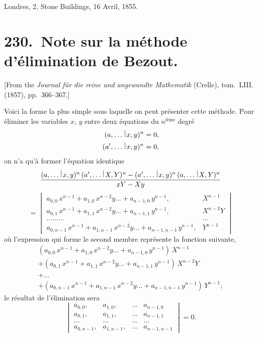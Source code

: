 \documentclass[11pt,a4paper]{book}
\theoremstyle{plain}
\newcommand{\wrule}{\hspace{-0.1em}\mid\hspace{-0.1em}}
\begin{document}
\begin{flushright}
Londres, 2, Stone Buildings, 16 Avril, 1855.
\end{flushright}
\newpage

\chapter[Note sur la m\'{e}thode d'\'{e}limination de Bezout]{230.\ Note sur la m\'{e}thode d'\'{e}limination de Bezout.}
\label{paper230}

\begin{center}
\small
[From the \textit{Journal f\"{u}r die reine und angewandte Mathematik} (Crelle), tom.~LIII. (1857), pp.~366--367.]
\end{center}

\bigskip

Voici la forme la plus simple sous laquelle on peut pr\'{e}senter cette m\'{e}thode. Pour \'{e}liminer les variables $x$, $y$ entre deux \'{e}quations du $n^{\text{i\`{e}me}}$ degr\'{e}
\begin{align*}
(a,\ldots\,\raisebox{0.5ex}{$\wrule$}\,x,y)^n&=0,\\
(a',\ldots\,\raisebox{0.5ex}{$\wrule$}\,x,y)^n&=0,
\end{align*}
on n'a qu'\`{a} former l'\'{e}quation identique
\[
\frac{(a,\ldots\,\raisebox{0.5ex}{$\wrule$}\,x,y)^n\,(a',\ldots\,\raisebox{0.5ex}{$\wrule$}\,X,Y)^n-(a',\ldots\,\raisebox{0.5ex}{$\wrule$}\,x,y)^n\,(a,\ldots\,\raisebox{0.5ex}{$\wrule$}\,X,Y)^n}{xY-Xy}
\]
\[
=\begin{vmatrix}
a_{0,0}\,x^{n-1}+a_{1,0}\,x^{n-2}y\ldots+a_{n-1,0}\,y^{n-1}, & X^{n-1}\\
a_{0,1}\,x^{n-1}+a_{1,1}\,x^{n-2}y\ldots+a_{n-1,1}\,y^{n-1}, & X^{n-2}Y\\
\ldots\ldots\ldots & \ldots\\
a_{0,n-1}\,x^{n-1}+a_{1,n-1}\,x^{n-2}y\ldots+a_{n-1,n-1}\,y^{n-1}, & Y^{n-1}
\end{vmatrix}
\]
o\`{u} l'expression qui forme le second membre repr\'{e}sente la fonction suivante,
\begin{multline*}
(a_{0,0}\,x^{n-1}+a_{1,0}\,x^{n-2}y\ldots+a_{n-1,0}\,y^{n-1})\,X^{n-1}\\
+(a_{0,1}\,x^{n-1}+a_{1,1}\,x^{n-2}y\ldots+a_{n-1,1}\,y^{n-1})\,X^{n-2}Y\\
+\ldots\\
+(a_{0,n-1}\,x^{n-1}+a_{1,n-1}\,x^{n-2}y\ldots+a_{n-1,n-1}\,y^{n-1})\,Y^{n-1};
\end{multline*}
le r\'{e}sultat de l'\'{e}limination sera
\[
\begin{vmatrix}
a_{0,0}, & a_{1,0}, & \ldots & a_{n-1,0}\\
a_{0,1}, & a_{1,1}, & \ldots & a_{n-1,1}\\
\ldots & \ldots & \ldots & \ldots\\
a_{0,n-1}, & a_{1,n-1}, & \ldots & a_{n-1,n-1}
\end{vmatrix}
=0.
\]
\end{document}

